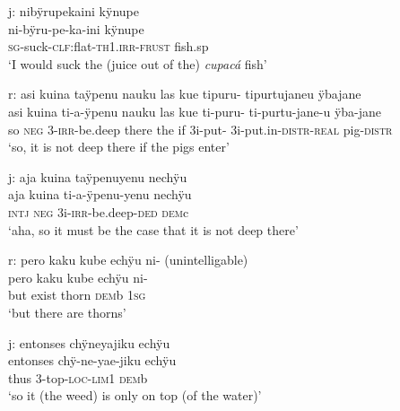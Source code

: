 \ea%
\begingl 
\glpreamble \textup{j:} nibÿrupekaini kÿnupe\\
\gla ni-bÿru-pe-ka-ini kÿnupe\\
\textsc{sg}-suck-\textsc{clf:}flat-\textsc{th}1\textsc{.irr}-\textsc{frust} fish.sp\\
\glft ‘I would suck the (juice out of the) \textit{cupacá} fish’
\endgl
\xe

\ea%
\begingl 
\glpreamble \textup{r:} asi kuina taÿpenu nauku las kue tipuru- tipurtujaneu ÿbajane\\
\gla asi kuina ti-a-ÿpenu nauku las kue ti-puru- ti-purtu-jane-u ÿba-jane\\ 
\glb so \textsc{neg} 3-\textsc{irr}-be.deep there the if 3i-put- 3i-put.in-\textsc{distr}-\textsc{real} pig-\textsc{distr}\\ 
\glft ‘so, it is not deep there if the pigs enter’\\ 
\endgl
\xe

\ea%
\begingl 
\glpreamble \textup{j:} aja kuina taÿpenuyenu nechÿu\\
\gla aja kuina ti-a-ÿpenu-yenu nechÿu\\
\glb \textsc{intj} \textsc{neg} 3i-\textsc{irr}-be.deep-\textsc{ded} \textsc{dem}c\\ 
\glft ‘aha, so it must be the case that it is not deep there’\\ 
\endgl
\xe


\ea%
\begingl 
\glpreamble \textup{r:} pero kaku kube echÿu ni- \textup{(unintelligable)}\\
\gla pero kaku kube echÿu ni-\\ 
\glb but exist thorn \textsc{dem}b 1\textsc{sg}\\ 
\glft ‘but there are thorns’\\ 
\endgl
\xe

\ea%
\begingl 
\glpreamble \textup{j:} entonses chÿneyajiku echÿu\\
\gla entonses chÿ-ne-yae-jiku echÿu\\ 
\glb thus 3-top-\textsc{loc}-\textsc{lim}1 \textsc{dem}b\\ 
\glft ‘so it (the weed) is only on top (of the water)’\\ 
\endgl
\xe


